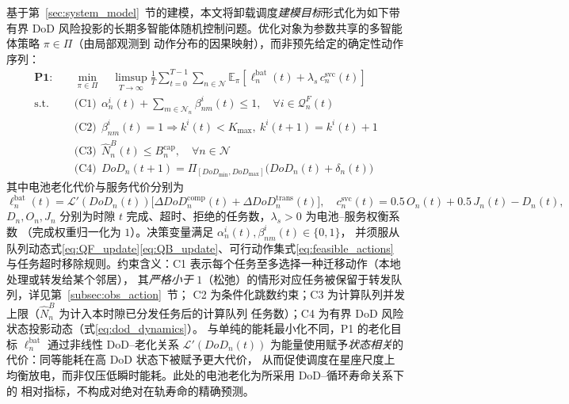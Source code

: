 \documentclass[a4paper,11pt]{article}
\begin{document}
基于第~\ref{sec:system_model}~节的建模，本文将卸载调度\emph{建模目标}形式化为如下带有界 DoD
风险投影的长期多智能体随机控制问题。优化对象为参数共享的多智能体策略 $\pi\in\Pi$（由局部观测到
动作分布的因果映射），而非预先给定的确定性动作序列：
\begin{equation}
\begin{aligned}
\mathbf{P1:}\quad &\min_{\pi \in \Pi}\quad
\limsup_{T \to \infty} \frac{1}{T} \sum_{t=0}^{T-1}
\sum_{n \in \mathcal{N}} \mathbb{E}_\pi\!\left[
\ell^{\mathrm{bat}}_n(t) + \lambda_s\, c^{\mathrm{svc}}_n(t)
\right] \\
\text{s.t.}\quad
&\text{(C1)}\ \ \alpha^i_n(t) + \sum_{m \in \mathcal{N}_n}
\beta^i_{nm}(t) \leq 1,\quad \forall i \in \mathcal{Q}^F_n(t) \\
&\text{(C2)}\ \ \beta^i_{nm}(t)=1 \Rightarrow k^i(t) < K_{\max},\
k^i(t\!+\!1)=k^i(t)+1 \\
&\text{(C3)}\ \ \hat{N}^B_n(t) \leq B^{\mathrm{cap}}_n,\quad \forall n \in \mathcal{N} \\
&\text{(C4)}\ \ DoD_n(t\!+\!1) =
\Pi_{[DoD_{\min},DoD_{\max}]}\!\big(DoD_n(t)+\delta_n(t)\big)
\end{aligned}
\label{eq:P1}
\end{equation}
其中电池老化代价与服务代价分别为
\begin{equation}
\ell^{\mathrm{bat}}_n(t) = \mathcal{L}'(DoD_n(t))\big[
\Delta DoD^{\mathrm{comp}}_n(t)+\Delta DoD^{\mathrm{trans}}_n(t)\big],
\quad
c^{\mathrm{svc}}_n(t) = 0.5\,O_n(t)+0.5\,J_n(t)-D_n(t),
\label{eq:p1_terms}
\end{equation}
$D_n,O_n,J_n$ 分别为时隙 $t$ 完成、超时、拒绝的任务数，$\lambda_s>0$ 为电池--服务权衡系数
（完成权重归一化为 $1$）。决策变量满足 $\alpha^i_n(t),\beta^i_{nm}(t)\in\{0,1\}$，
并须服从队列动态式\eqref{eq:QF_update}\eqref{eq:QB_update}、可行动作集式\eqref{eq:feasible_actions}
与任务超时移除规则。约束含义：C1 表示每个任务至多选择一种迁移动作（本地处理或转发给某个邻居），
其\emph{严格小于} $1$（松弛）的情形对应任务被保留于转发队列，详见第~\ref{subsec:obs_action}~节；
C2 为条件化跳数约束；C3 为计算队列并发上限（$\hat{N}^B_n$ 为计入本时隙已分发任务后的计算队列
任务数）；C4 为有界 DoD 风险状态投影动态（式\eqref{eq:dod_dynamics}）。
与单纯的能耗最小化不同，P1 的老化目标 $\ell^{\mathrm{bat}}_n$ 通过非线性 DoD--老化关系
$\mathcal{L}'(DoD_n(t))$ 为能量使用赋予\emph{状态相关}的代价：同等能耗在高 DoD 状态下被赋予更大代价，
从而促使调度在星座尺度上均衡放电，而非仅压低瞬时能耗。此处的电池老化为所采用 DoD--循环寿命关系下的
相对指标，不构成对绝对在轨寿命的精确预测。
\end{document}
